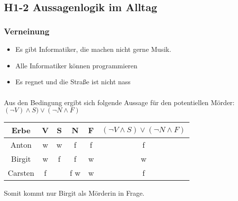\documentclass{article}
\begin{document}
\subsection{H1-2 Aussagenlogik im Alltag}
\subsubsection{Verneinung}

\begin{itemize}
    \item Es gibt Informatiker, die machen nicht gerne Musik.
    \item  Alle Informatiker können programmieren
    \item  Es regnet und die Straße ist nicht nass
\end{itemize}

\subsubsection{}
Aus den Bedingung ergibt sich folgende Aussage für den potentiellen Mörder:
\((\neg V)\land S) \lor (\neg N \land F)\)

\begin{center}
\begin{tabular}{|c || c c c c | c |}
Erbe & V & S & N & F & \( (\neg V \land S) \lor (\neg N \land F) \) \\

 \hline
 Anton & w & w & f & f & f\\
 Birgit & w & f & f & w & w\\
 Carsten & f & & f w & w & f \\
\end{tabular}
\end{center}

Somit kommt nur Birgit als Mörderin in Frage.
\end{document}

